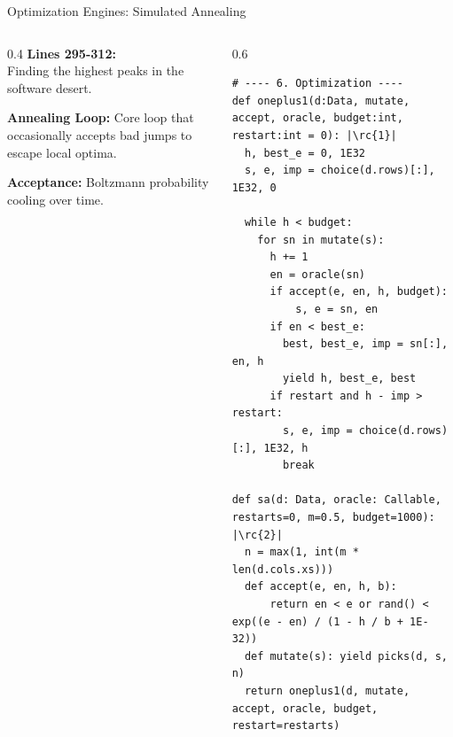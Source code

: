 \begin{frame}[fragile]{Optimization Engines: Simulated Annealing}
\begin{columns}[T]
  \begin{column}{0.4\textwidth}
    \footnotesize 
    \textbf{Lines 295-312:}\\
    Finding the highest peaks in the software desert.

    \vspace{0.2cm}
     \textbf{Annealing Loop:} Core loop that occasionally accepts bad jumps to escape local optima.
    
    \vspace{0.15cm}
     \textbf{Acceptance:} Boltzmann probability cooling over time.
  \end{column}
  
  \begin{column}{0.6\textwidth}
\begin{verbatim}
# ---- 6. Optimization ----
def oneplus1(d:Data, mutate, accept, oracle, budget:int, restart:int = 0): |\rc{1}|
  h, best_e = 0, 1E32
  s, e, imp = choice(d.rows)[:], 1E32, 0
  
  while h < budget:
    for sn in mutate(s):
      h += 1
      en = oracle(sn)
      if accept(e, en, h, budget): 
          s, e = sn, en
      if en < best_e:
        best, best_e, imp = sn[:], en, h
        yield h, best_e, best
      if restart and h - imp > restart:
        s, e, imp = choice(d.rows)[:], 1E32, h
        break

def sa(d: Data, oracle: Callable, restarts=0, m=0.5, budget=1000): |\rc{2}|
  n = max(1, int(m * len(d.cols.xs)))
  def accept(e, en, h, b): 
      return en < e or rand() < exp((e - en) / (1 - h / b + 1E-32))
  def mutate(s): yield picks(d, s, n)
  return oneplus1(d, mutate, accept, oracle, budget, restart=restarts)
\end{verbatim}
  \end{column}
\end{columns}
\end{frame}
